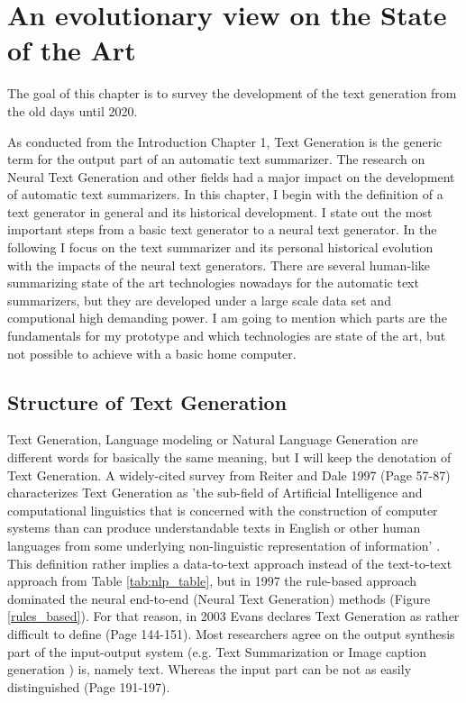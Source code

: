 \chapter{An evolutionary view on the State of the Art}\label{ch:sota}

The goal of this chapter is to survey the development of the text generation from the old days until 2020. 

As conducted from the Introduction Chapter 1, Text Generation is the generic term for the output part of an automatic text summarizer. The research on Neural Text Generation and other fields had a major impact on the development of automatic text summarizers. In this chapter, I begin with the definition of a text generator in general and its historical development. I state out the most important steps from a basic text generator to a neural text generator. In the following I focus on the text summarizer and its personal historical evolution with the impacts of the neural text generators. There are several human-like summarizing state of the art technologies nowadays for the automatic text summarizers, but they are developed under a large scale data set and computional high demanding power. I am going to mention which parts are the fundamentals for my prototype and which technologies are state of the art, but not possible to achieve with a basic home computer.

\section{Structure of Text Generation }\label{ss:history}

Text Generation, Language modeling or Natural Language Generation are different words for basically the same meaning, but I will keep the denotation of Text Generation. A widely-cited survey from Reiter and Dale 1997 (Page 57-87) \cite{reiter} characterizes Text Generation as 'the sub-field of Artificial Intelligence and computational linguistics that is concerned with the construction of computer systems than can produce understandable texts in English or other human languages from some underlying non-linguistic representation of information' \cite{reiter}. This definition rather implies a data-to-text approach instead of the text-to-text approach from Table \ref{tab:nlp_table}, but in 1997 the rule-based approach dominated the neural end-to-end (Neural Text Generation) methods (Figure \ref{rules_based}). For that reason, in 2003 Evans declares Text Generation as rather difficult to define \cite{evans} (Page 144-151). Most researchers agree on the output synthesis part of the input-output system (e.g. Text Summarization or Image caption generation \cite{mitchell}) is, namely text. Whereas the input part can be not as easily distinguished \cite{mcdonald} (Page 191-197).

